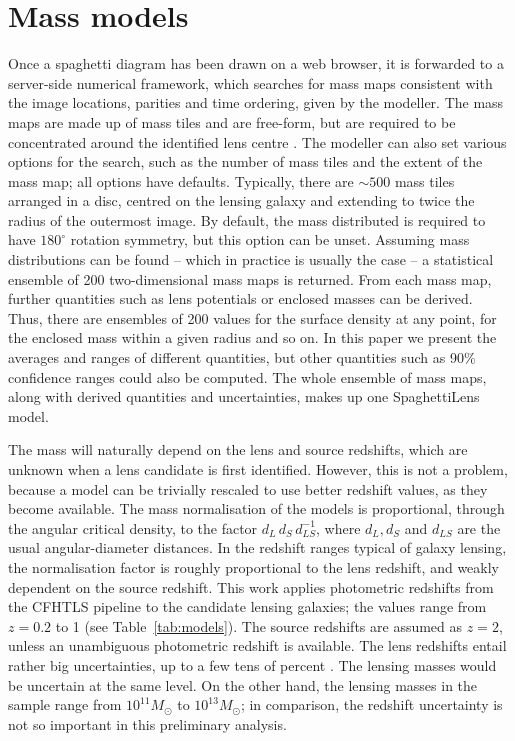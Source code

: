 
\section{Mass models}\label{sec:massmodels}



Once a spaghetti diagram has been drawn on a web browser, it is
forwarded to a server-side numerical framework, which searches for
mass maps consistent with the image locations, parities and time
ordering, given by the modeller.  The mass maps are made up of mass
tiles and are free-form, but are required to be concentrated around
the identified lens centre \citep[see][for the precise formulation of
  the search problem]{2014MNRAS.445.2181C}.  The modeller can also set
various options for the search, such as the number of mass tiles and
the extent of the mass map; all options have defaults.  Typically,
there are $\sim500$ mass tiles arranged in a disc, centred on the
lensing galaxy and extending to twice the radius of the outermost
image.  By default, the mass distributed is required to have
$180^\circ$ rotation symmetry, but this option can be unset.  Assuming
mass distributions can be found -- which in practice is usually the
case -- a statistical ensemble of 200 two-dimensional mass maps is
returned.  From each mass map, further quantities such as lens
potentials or enclosed masses can be derived.  Thus, there are
ensembles of 200 values for the surface density at any point, for the
enclosed mass within a given radius and so on.  In this paper we
present the averages and ranges of different quantities, but other
quantities such as 90\% confidence ranges could also be computed.  The
whole ensemble of mass maps, along with derived quantities and
uncertainties, makes up one SpaghettiLens model.

The mass will naturally depend on the lens and source redshifts, which
are unknown when a lens candidate is first identified.  However, this
is not a problem, because a model can be trivially rescaled to use
better redshift values, as they become available.  The mass
normalisation of the models is proportional, through the angular
critical density, to the factor $d_L\, d_S\, d_{LS}^{-1}$, where
$d_L,d_S$ and $d_{LS}$ are the usual angular-diameter distances.  In
the redshift ranges typical of galaxy lensing, the normalisation
factor is roughly proportional to the lens redshift, and weakly
dependent on the source redshift.  This work applies photometric
redshifts from the CFHTLS pipeline \citep{2009A&A...500..981C} to the
candidate lensing galaxies; the values range from $z=0.2$ to 1 (see
Table~\ref{tab:models}).  The source redshifts are assumed as $z=2$,
unless an unambiguous photometric redshift is available.  The lens
redshifts entail rather big uncertainties, up to a few tens of percent
\citep[see Fig.~5 in][]{2009A&A...500..981C}. The lensing masses would
be uncertain at the same level.  On the other hand, the lensing masses
in the sample range from $10^{11}M_\odot$ to $10^{13}M_\odot$; in
comparison, the redshift uncertainty is not so important in this
preliminary analysis.

